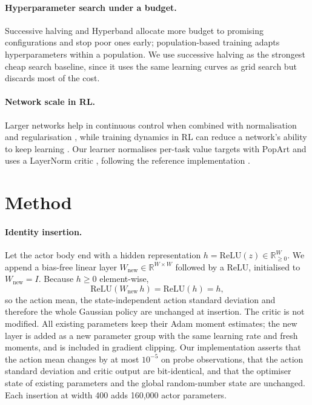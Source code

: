 \documentclass{article}
\begin{document}
\paragraph{Hyperparameter search under a budget.}
Successive halving and Hyperband \citep{jamieson2016sh,li2018hyperband} allocate more budget to promising configurations and stop poor ones early; population-based training \citep{jaderberg2017pbt} adapts hyperparameters within a population.
We use successive halving as the strongest cheap search baseline, since it uses the same learning curves as grid search but discards most of the cost.

\paragraph{Network scale in RL.}
Larger networks help in continuous control when combined with normalisation and regularisation \citep{nauman2024bro,lee2025simba}, while training dynamics in RL can reduce a network's ability to keep learning \citep{nikishin2022primacy,lyle2023plasticity}.
Our learner normalises per-task value targets with PopArt \citep{vanhasselt2016popart,hessel2019popart} and uses a LayerNorm critic \citep{ba2016layernorm}, following the reference implementation \citep{li2026toppo}.

\section{Method}

\paragraph{Identity insertion.}
Let the actor body end with a hidden representation $h = \mathrm{ReLU}(z) \in \mathbb{R}_{\ge 0}^{W}$.
We append a bias-free linear layer $W_{\text{new}} \in \mathbb{R}^{W\times W}$ followed by a ReLU, initialised to $W_{\text{new}} = I$.
Because $h \ge 0$ element-wise,
\begin{equation}
    \mathrm{ReLU}(W_{\text{new}}\, h) = \mathrm{ReLU}(h) = h ,
\end{equation}
so the action mean, the state-independent action standard deviation and therefore the whole Gaussian policy are unchanged at insertion.
The critic is not modified.
All existing parameters keep their Adam \citep{kingma2015adam} moment estimates; the new layer is added as a new parameter group with the same learning rate and fresh moments, and is included in gradient clipping.
Our implementation asserts that the action mean changes by at most $10^{-5}$ on probe observations, that the action standard deviation and critic output are bit-identical, and that the optimiser state of existing parameters and the global random-number state are unchanged.
Each insertion at width 400 adds 160{,}000 actor parameters.
\end{document}
